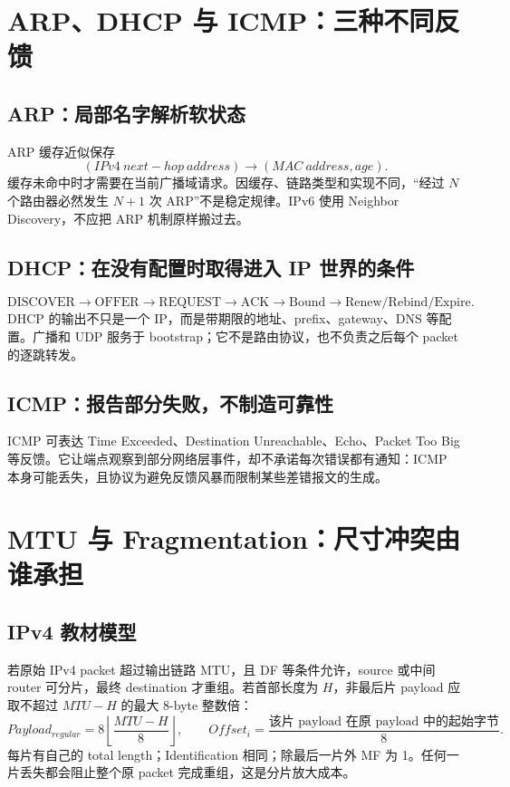 \documentclass[11pt,a4paper]{ctexart}
\begin{document}
\section{ARP、DHCP 与 ICMP：三种不同反馈}

\subsection{ARP：局部名字解析软状态}

ARP 缓存近似保存
\[
(IPv4\ next\!\!-hop\ address)\to(MAC\ address, age).
\]
缓存未命中时才需要在当前广播域请求。因缓存、链路类型和实现不同，“经过 $N$ 个路由器必然发生 $N+1$ 次 ARP”不是稳定规律。IPv6 使用 Neighbor Discovery，不应把 ARP 机制原样搬过去。

\subsection{DHCP：在没有配置时取得进入 IP 世界的条件}

\[
\text{DISCOVER}\to\text{OFFER}\to\text{REQUEST}\to\text{ACK}
\to\text{Bound}\to\text{Renew/Rebind/Expire}.
\]
DHCP 的输出不只是一个 IP，而是带期限的地址、prefix、gateway、DNS 等配置。广播和 UDP 服务于 bootstrap；它不是路由协议，也不负责之后每个 packet 的逐跳转发。

\subsection{ICMP：报告部分失败，不制造可靠性}

ICMP 可表达 Time Exceeded、Destination Unreachable、Echo、Packet Too Big 等反馈。它让端点观察到部分网络层事件，却不承诺每次错误都有通知：ICMP 本身可能丢失，且协议为避免反馈风暴而限制某些差错报文的生成。

\section{MTU 与 Fragmentation：尺寸冲突由谁承担}

\subsection{IPv4 教材模型}

若原始 IPv4 packet 超过输出链路 MTU，且 DF 等条件允许，source 或中间 router 可分片，最终 destination 才重组。若首部长度为 $H$，非最后片 payload 应取不超过 $MTU-H$ 的最大 8-byte 整数倍：
\[
Payload_{regular}=8\left\lfloor\frac{MTU-H}{8}\right\rfloor,
\qquad
Offset_i=\frac{\text{该片 payload 在原 payload 中的起始字节}}{8}.
\]
每片有自己的 total length；Identification 相同；除最后一片外 MF 为 1。任何一片丢失都会阻止整个原 packet 完成重组，这是分片放大成本。
\end{document}
